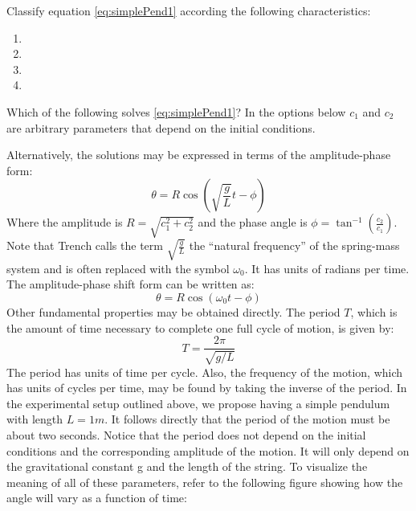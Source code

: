 \documentclass{ximera}
\begin{document}
\begin{problem}
Classify equation \eqref{eq:simplePend1} according the following characteristics:
 \begin{enumerate}
     \item {}
     \item {}
     \item {}
     \item {}
 \end{enumerate}
\end{problem}
\begin{problem}
Which of the following solves \eqref{eq:simplePend1}?  In the options below $c_1$ and $c_2$ are arbitrary parameters that depend on the initial conditions.
  \begin{multipleChoice}
    \end{multipleChoice}
\end{problem}
Alternatively, the solutions may be expressed in terms of the amplitude-phase form:
$$\theta=R\cos\left(\sqrt{\frac{g}{L}}t-\phi\right)$$
Where the amplitude is $R=\sqrt{c_1^2+c_2^2}$ and the phase angle is $\phi=\tan^{-1}\left(\frac{c_2}{c_1}\right)$. Note that Trench calls the term $\sqrt{\frac{g}{L}}$ the “natural frequency” of the spring-mass system and is often replaced with the symbol $\omega_0$.  It has units of radians per time.  The amplitude-phase shift form can be written as:
$$\theta=R\cos(\omega_0t-\phi)$$
Other fundamental properties may be obtained directly.  The period $T$, which is the amount of time necessary to complete one full cycle of motion, is given by:
$$T=\frac{2\pi}{\sqrt{g/L}}$$
The period has units of time per cycle.  Also, the frequency of the motion, which has units of cycles per time, may be found by taking the inverse of the period.  In the experimental setup outlined above, we propose having a simple pendulum with length $L=1 m$.  It follows directly that the period of the motion must be about two seconds.  Notice that the period does not depend on the initial conditions and the corresponding amplitude of the motion.  It will only depend on the gravitational constant g and the length of the string.   
To visualize the meaning of all of these parameters, refer to the following figure showing how the angle will vary as a function of time:
\end{document}
